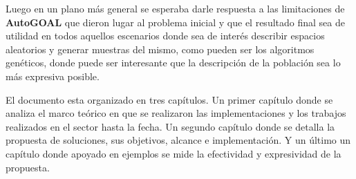 Luego en un plano más general se esperaba darle respuesta a las limitaciones
de {\bf AutoGOAL} que dieron lugar al problema inicial y que el resultado final sea
de utilidad en todos aquellos escenarios donde sea de interés describir espacios
aleatorios y generar muestras del mismo, como pueden ser los algoritmos genéticos,
donde puede ser interesante que la descripción de la población sea lo más expresiva
posible.

El documento esta organizado en tres capítulos. Un primer capítulo donde se analiza
el marco teórico en que se realizaron las implementaciones y los trabajos realizados
en el sector hasta la fecha. Un segundo capítulo donde se detalla la propuesta de soluciones, sus
objetivos, alcance e implementación. Y un último un capítulo donde apoyado en ejemplos
se mide la efectividad y expresividad de la propuesta.
